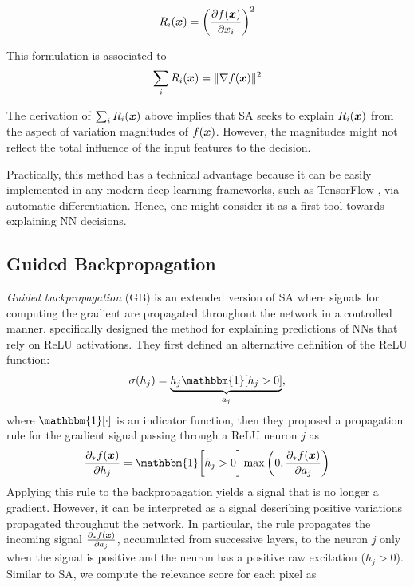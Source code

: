 \begin{align*}
	R_i(\x) =
	 \bigg( \frac{\partial f(\patvector{x})}{ \partial x_i } \bigg)^2
\end{align*}
	
This formulation is associated to
\begin{align*}
	\sum_i R_i(\x) = \| \nabla f(\patvector{x}) \|^2
\end{align*}

The derivation of $\sum_i R_i(\boldsymbol{x})$ above implies that SA seeks to explain $R_i(\boldsymbol{x})$ from the aspect of variation magnitudes of $f(\boldsymbol{x})$. However, the magnitudes might not reflect the total influence of the input features to the decision.

Practically, this method has a technical advantage because it can be easily implemented in any modern deep learning frameworks, such as TensorFlow \citep{AbadiTensorFlowLargeScaleMachine2016}, via automatic differentiation. Hence, one might consider it as a first tool towards explaining NN decisions.

\subsection{Guided Backpropagation}
\textit{Guided backpropagation} (GB) is an extended version of SA where signals for computing the gradient are propagated throughout the network in a controlled manner. \citet{SpringenbergStrivingSimplicityAll2015a} specifically designed the method for explaining predictions of NNs that rely on ReLU activations.  They first defined an alternative definition  of the ReLU function:
\begin{align*}
	\sigma(h_j) = \underbrace{h_j \mathbbm{1}[ h_j > 0 ]}_{a_j},
\end{align*}
where $\mathbbm{1}[ \cdot ]$  is an indicator function, then they proposed a  propagation rule for the gradient signal passing through a ReLU neuron $j$ as
\begin{align*}
	\frac{\partial_* f(\patvector{x}) }{ \partial h_j } = \mathbbm{1}\bigg[h_j > 0 \bigg] \max \bigg(0, \frac{ \partial_* f(\patvector{x}) }{ \partial a_j } \bigg)
\end{align*}
Applying this rule to the backpropagation yields a signal that is no longer a gradient. However, it can be interpreted as a signal describing positive variations propagated throughout the network. In particular, the rule propagates the incoming signal $\frac{\partial_* f(\boldsymbol{x})}{\partial a_j}$, accumulated from successive layers,  to the neuron $j$ only when the signal is positive and the neuron has a positive raw excitation ($h_j > 0$). Similar to SA, we compute the relevance score for each pixel  as 

